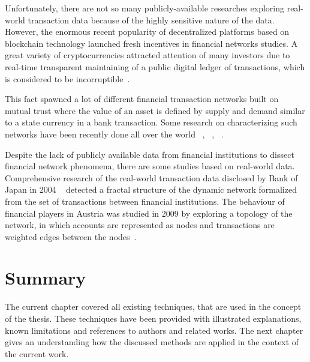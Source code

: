 Unfortunately, there are not so many publicly-available researches exploring real-world transaction data because of the highly sensitive nature of the data. However, the enormous recent popularity of decentralized platforms based on blockchain technology launched fresh incentives in financial networks studies. A great variety of cryptocurrencies attracted attention of many investors due to real-time transparent maintaining of a public digital ledger of transactions, which is considered to be incorruptible~\cite{miraz2018applications}.

This fact spawned a lot of different financial transaction networks built on mutual trust where the value of an asset is defined by supply and demand similar to a state currency in a bank transaction. Some research on characterizing such networks have been recently done all over the world ~\cite{victormeasuring}, ~\cite{BlockchainGraph}, ~\cite{miller2015discovering}.

Despite the lack of publicly available data from financial institutions to dissect financial network phenomena, there are some studies based on real-world data. Comprehensive research of the real-world transaction data disclosed by Bank of Japan in 2004 ~\cite{inaoka2004fractal} detected a fractal structure of the dynamic network formalized from the set of transactions between financial institutions. The behaviour of financial players in Austria was studied in 2009 by exploring a topology of the network, in which accounts are represented as nodes and transactions are weighted edges between the nodes~\cite{Kyriakopoulos2009}.

\section{Summary}
The current chapter covered all existing techniques, that are used in the concept of the thesis. These techniques have been provided with illustrated explanations, known limitations and references to authors and related works. The next chapter gives an understanding how the discussed methods are applied in the context of the current work.
